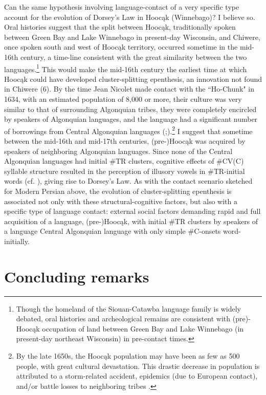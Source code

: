 \documentclass[output=paper,
modfonts
]{LSP/langsci}
\begin{document}
Can the same hypothesis involving language-contact of a very specific
type account for the evolution of Dorsey's Law in Hoocąk (Winnebago)? I
believe so. Oral histories suggest that the split between Hoocąk,
traditionally spoken between Green Bay and Lake Winnebago in present-day
Wisconsin, and Chiwere, once spoken south and west of Hoocąk territory,
occurred sometime in the mid-16th century, a time-line consistent with
the great similarity between the two languages.\footnote{Though the
  homeland of the Siouan-Catawba language family is widely debated, oral
  histories and archeological remains are consistent with (pre)-Hoocąk
  occupation of land between Green Bay and Lake Winnebago (in
  present-day northeast Wisconsin) in pre-contact times.} This would
make the mid-16th century the earliest time at which Hoocąk could have
developed cluster-splitting epenthesis, an innovation not found in
Chiwere (6). By the time Jean Nicolet made contact with the ``Ho-Chunk"
in 1634, with an estimated population of 8,000 or more, their culture
was very similar to that of surrounding Algonquian tribes, they were
completely encircled by speakers of Algonquian languages, and the
language had a significant number of borrowings from Central Algonquian
languages (\citealt{radin1990a};\citealt[17]{pfister2009a}).\footnote{By the late 1650s, the
  Hoocąk population may have been as few as 500 people, with great
  cultural devastation. This drastic decrease in population is
  attributed to a storm-related accident, epidemics (due to European
  contact), and/or battle losses to neighboring tribes \citep{edmunds1978a, radin1990a}.} I suggest that sometime between the mid-16th and
mid-17th centuries, (pre-)Hoocąk was acquired by speakers of neighboring
Algonquian languages. Since none of the Central Algonquian languages had
initial \#TR clusters, cognitive effects of \#CV(C) syllable structure
resulted in the perception of illusory vowels in \#TR-initial words (cf.
\citealt{dupoux1999a}), giving rise to Dorsey's Law. As with the contact
scenario sketched for Modern Persian above, the evolution of
cluster-splitting epenthesis is associated not only with these
structural-cognitive factors, but also with a specific type of language
contact: external social factors demanding rapid and full acquisition of
a language, (pre-)Hoocąk, with initial \#TR clusters by speakers of a
language Central Algonquian language with only simple \#C-onsets
word-initially.

\section{Concluding remarks}
\end{document}
